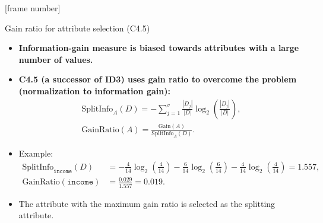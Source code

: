 \documentclass[aspectratio=169,t,table]{beamer}
\begin{document}
  {
    [frame number]
    \begin{frame}{Gain ratio for attribute selection (C4.5)}
      \begin{itemize}
        \item \textbf{Information-gain measure is biased towards attributes with a large number of values.}
        \item \textbf{C4.5 (a successor of ID3) uses gain ratio to overcome the problem (normalization to information gain):}
        \begin{align}
          \text{SplitInfo}_A(D) = - \sum_{j=1}^{v} \frac{|D_j|}{|D|} \log_2\left( \frac{|D_j|}{|D|} \right),\\
          \text{GainRatio}(A) = \frac{\text{Gain}(A)}{\text{SplitInfo}_A(D)}.
        \end{align}
        \item Example:
        \begin{align}
          \text{SplitInfo}_{\texttt{income}}(D) &= -\frac{4}{14} \log_2 \left( \frac{4}{14} \right) - \frac{6}{14} \log_2 \left( \frac{6}{14} \right) - \frac{4}{14} \log_2 \left( \frac{4}{14} \right) = 1.557,\\
          \text{GainRatio}(\texttt{income}) &= \frac{0.029}{1.557} = 0.019.
        \end{align}
        \item The attribute with the maximum gain ratio is selected as the splitting attribute.
      \end{itemize}
    \end{frame}
  }
\end{document}
